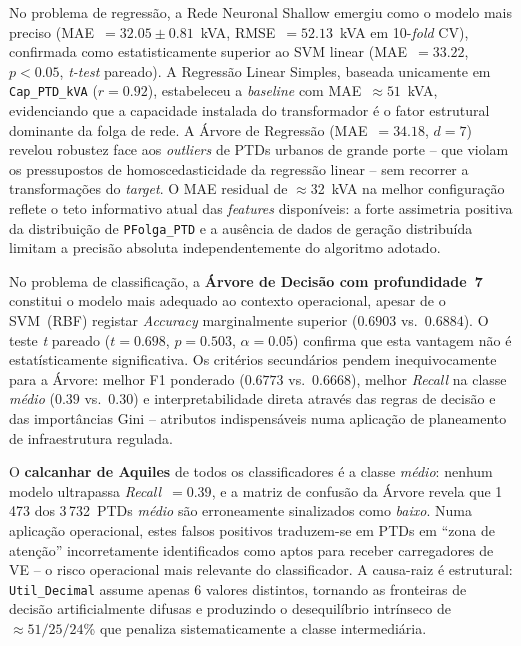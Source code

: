 \documentclass[conference]{IEEEtran}
\begin{document}
No problema de regress\~ao, a Rede Neuronal Shallow emergiu como o modelo
mais preciso (MAE~$= 32.05 \pm 0.81$~kVA, RMSE~$= 52.13$~kVA em
10-\textit{fold} CV), confirmada como estatisticamente superior ao SVM
linear (MAE~$= 33.22$, $p < 0.05$, \textit{t-test} pareado). A Regress\~ao
Linear Simples, baseada unicamente em \texttt{Cap\_PTD\_kVA} ($r = 0.92$),
estabeleceu a \textit{baseline} com MAE~$\approx 51$~kVA, evidenciando que
a capacidade instalada do transformador \'e o fator estrutural dominante
da folga de rede. A \'Arvore de Regress\~ao (MAE~$= 34.18$, $d = 7$) revelou
robustez face aos \textit{outliers} de PTDs urbanos de grande porte --
que violam os pressupostos de homoscedasticidade da regress\~ao linear --
sem recorrer a transforma\c{c}\~oes do \textit{target}. O MAE residual de
$\approx$32~kVA na melhor configura\c{c}\~ao reflete o teto informativo
atual das \textit{features} dispon\'iveis: a forte assimetria positiva da
distribui\c{c}\~ao de \texttt{PFolga\_PTD} e a aus\^encia de dados de
gera\c{c}\~ao distribu\'ida limitam a precis\~ao absoluta independentemente
do algoritmo adotado.

No problema de classifica\c{c}\~ao, a \textbf{\'Arvore de Decis\~ao com
profundidade~7} constitui o modelo mais adequado ao contexto operacional,
apesar de o SVM~(RBF) registar \textit{Accuracy} marginalmente superior
($0.6903$ vs.\ $0.6884$). O teste \textit{t} pareado ($t = 0.698$,
$p = 0.503$, $\alpha = 0.05$) confirma que esta vantagem n\~ao \'e
estat\'isticamente significativa. Os crit\'erios secund\'arios pendem
inequivocamente para a \'Arvore: melhor F1 ponderado ($0.6773$ vs.\
$0.6668$), melhor \textit{Recall} na classe \textit{m\'edio} ($0.39$ vs.\
$0.30$) e interpretabilidade direta atrav\'es das regras de decis\~ao e
das import\^ancias Gini -- atributos indispens\'aveis numa aplica\c{c}\~ao
de planeamento de infraestrutura regulada.

O \textbf{calcanhar de Aquiles} de todos os classificadores \'e a classe
\textit{m\'edio}: nenhum modelo ultrapassa \textit{Recall}~$= 0.39$, e a
matriz de confus\~ao da \'Arvore revela que 1\,473 dos 3\,732~PTDs
\textit{m\'edio} s\~ao erroneamente sinalizados como \textit{baixo}. Numa
aplica\c{c}\~ao operacional, estes falsos positivos traduzem-se em PTDs em
``zona de aten\c{c}\~ao'' incorretamente identificados como aptos para
receber carregadores de VE -- o risco operacional mais relevante do
classificador. A causa-raiz \'e estrutural: \texttt{Util\_Decimal} assume
apenas 6 valores distintos, tornando as fronteiras de decis\~ao
artificialmente difusas e produzindo o desequil\'ibrio intr\'inseco de
$\approx51/25/24$\% que penaliza sistematicamente a classe intermedi\'aria.
\end{document}
